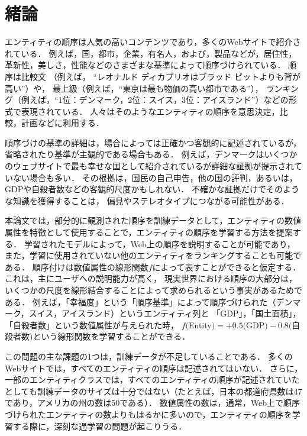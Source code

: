\chapter{緒論}
\label{sq:Introduction}
エンティティの順序は人気の高いコンテンツであり，多くのWebサイトで紹介されている．
例えば，国，都市，企業，有名人，および，製品などが，居住性，革新性，美しさ，性能などのさまざまな基準によって順序づけられている．
順序は比較文
（例えば， ``レオナルド ディカプリオはブラッド ピットよりも背が高い''）や，
最上級（例えば，``東京は最も物価の高い都市である''），
ランキング（例えば，``1位：デンマーク，2位：スイス，3位：アイスランド''）などの形式で表現されている．
人々はそのようなエンティティの順序を意思決定，比較，計画などに利用する．

順序づけの基準の詳細は，場合によっては正確かつ客観的に記述されているが，
省略されたり基準が主観的である場合もある．
例えば，デンマークはいくつかのウェブサイトで最も幸せな国として紹介されているが詳細な証拠が提示されていない場合も多い．
その根拠は，国民の自己申告，他の国の評判，あるいは，
GDPや自殺者数などの客観的尺度かもしれない．
不確かな証拠だけでそのような知識を獲得することは，
偏見やステレオタイプにつながる可能性がある．

本論文では，部分的に観測された順序を訓練データとして，エンティティの数値属性を特徴として使用することで，エンティティの順序を学習する方法を提案する．
学習されたモデルによって，Web上の順序を説明することが可能であり，
また，学習に使用されていない他のエンティティをランキングすることも可能である．
順序付けは数値属性の線形関数$f$によって表すことができると仮定する．
これは，主にユーザへの説明能力が高く，
現実世界における順序の大部分は，いくつかの尺度を線形結合することによって求められるという事実があるためである．
例えば，「幸福度」という「順序基準」によって順序づけられた（デンマーク，スイス，アイスランド）というエンティティ列と
「GDP」，「国土面積」，「自殺者数」という数値属性が与えられた時，
$f($Entity$) = +0.5($GDP$) − 0.8($自殺者数$)$という線形関数を学習することができる．

この問題の主な課題の1つは，訓練データが不足していることである．
多くのWebサイトでは，すべてのエンティティの順序は記述されてはいない．
さらに，一部のエンティティクラスでは，すべてのエンティティの順序が記述されていたとしても訓練データのサイズは十分ではない（たとえば，日本の都道府県数は47であり，アメリカの州の数は50である）．
数値属性の数は，通常，Web上で順序づけられたエンティティの数よりもはるかに多いので，エンティティの順序を学習する際に，深刻な過学習の問題が起こりうる．

